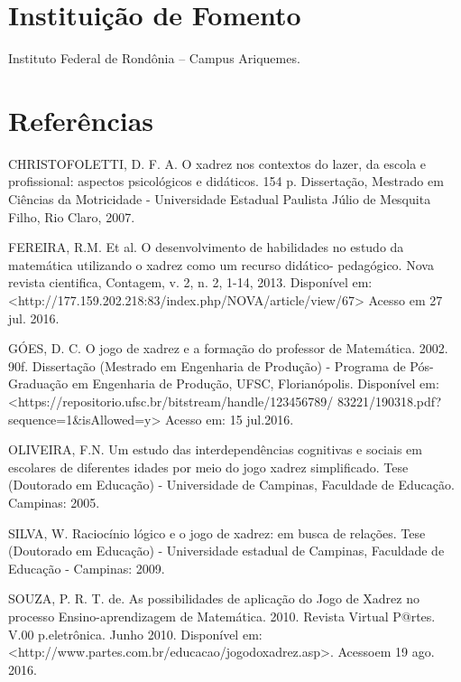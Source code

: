 \documentclass[article,12pt,onesidea,4paper,english,brazil]{abntex2}
\begin{document}
	\section*{Instituição de Fomento}
	
	Instituto Federal de Rondônia – Campus Ariquemes.
	
	\section*{Referências}
	
	\noindent CHRISTOFOLETTI, D. F. A. O xadrez nos contextos do lazer, da escola e profissional: aspectos psicológicos e didáticos. 154 p. Dissertação, Mestrado em Ciências da Motricidade
	- Universidade Estadual Paulista Júlio de Mesquita Filho, Rio Claro, 2007.
	
	\noindent FEREIRA, R.M. Et al. O desenvolvimento de habilidades no estudo da matemática utilizando o xadrez como um recurso didático- pedagógico. Nova revista cientifica, Contagem, v. 2, n. 2, 1-14, 2013. Disponível em:
	<http://177.159.202.218:83/index.php/NOVA/article/view/67> Acesso em 27 jul. 2016.
	
	\noindent GÓES, D. C. O jogo de xadrez e a formação do professor de Matemática. 2002. 90f. Dissertação (Mestrado em Engenharia de Produção) - Programa de Pós-Graduação em Engenharia de Produção, UFSC, Florianópolis. Disponível em:
	<https://repositorio.ufsc.br/bitstream/handle/123456789/
	83221/190318.pdf?sequence=1\&isAllowed=y> Acesso em: 15 jul.2016.
	
	\noindent OLIVEIRA, F.N. Um estudo das interdependências cognitivas e sociais em escolares de diferentes idades por meio do jogo xadrez simplificado. Tese (Doutorado em Educação) - Universidade de Campinas, Faculdade de Educação. Campinas: 2005.
	
	\noindent SILVA, W. Raciocínio lógico e o jogo de xadrez: em busca de relações. Tese (Doutorado em Educação) - Universidade estadual de Campinas, Faculdade de Educação - Campinas: 2009.
	
	\noindent SOUZA, P. R. T. de. As possibilidades de aplicação do Jogo de Xadrez no processo Ensino-aprendizagem de Matemática. 2010. Revista Virtual P@rtes. V.00 p.eletrônica. Junho 2010. Disponível em: <http://www.partes.com.br/educacao/jogodoxadrez.asp>. Acessoem 19 ago. 2016.
	
	
\end{document}
